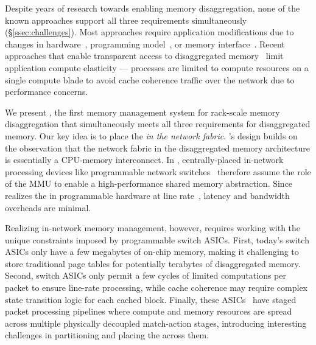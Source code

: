 Despite years of research towards enabling memory disaggregation, none of the known approaches support all three requirements simultaneously (\S\ref{ssec:challenges}). Most approaches require application modifications due to changes in hardware~\cite{industry1, industry2, nwsupport, memdisagg4}, programming model~\cite{piccolo, grappa}, or memory interface~\cite{farm, ramcloud, herd}. Recent approaches that enable transparent access to disaggregated memory~\cite{legoos, infiniswap, fastswap} limit application compute elasticity --- processes are limited to compute resources on a single compute blade to avoid cache coherence traffic over the network due to performance concerns.

We present \mind, the first memory management system for rack-scale memory disaggregation that simultaneously meets all three requirements for disaggregated memory. Our key idea is to place the \mmm \textit{in the network fabric}. \mind's design builds on the observation that the network fabric in the disaggregated memory architecture is essentially a CPU-memory interconnect. In \mind, centrally-placed in-network processing devices like programmable network switches~\cite{progswitch1, progswitch2, progswitch3} therefore assume the role of the MMU to enable a high-performance shared memory abstraction. Since \mind realizes the \mmm in programmable hardware at line rate~\cite{progswitch1}, latency and bandwidth overheads are minimal. 

Realizing in-network memory management, however, requires working with the unique constraints imposed by programmable switch ASICs. First, today's switch ASICs only have a few megabytes of on-chip memory, making it challenging to store traditional page tables for potentially terabytes of disaggregated memory. Second, switch ASICs only permit a few cycles of limited computations per packet to ensure line-rate processing, while cache coherence may require complex state transition logic for each cached block. Finally, these ASICs~\cite{p4paper} have staged packet processing pipelines where compute and memory resources are spread across multiple physically decoupled match-action stages, introducing interesting challenges in partitioning and placing the \mmm across them. 

